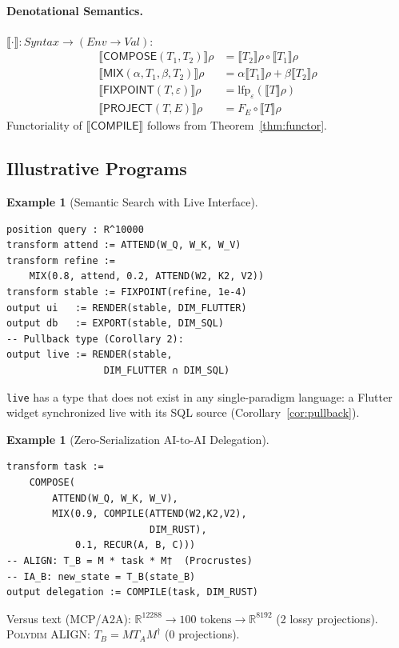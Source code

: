 \documentclass[10pt,twocolumn]{article}
\theoremstyle{plain}
\theoremstyle{definition}
\newtheorem{example}[theorem]{Example}
\theoremstyle{remark}
\newcommand{\RR}{\mathbb{R}}
\newcommand{\Compose}{\mathsf{COMPOSE}}
\newcommand{\Mix}{\mathsf{MIX}}
\newcommand{\Fixpoint}{\mathsf{FIXPOINT}}
\newcommand{\Project}{\mathsf{PROJECT}}
\newcommand{\lfp}{\mathrm{lfp}}
\begin{document}
\paragraph{Denotational Semantics.}
$\llbracket\cdot\rrbracket:\mathit{Syntax}\to(\mathit{Env}\to\mathit{Val})$:
\begin{align*}
\llbracket\Compose(T_1,T_2)\rrbracket\rho
  &=\llbracket T_2\rrbracket\rho\circ\llbracket T_1\rrbracket\rho\\
\llbracket\Mix(\alpha,T_1,\beta,T_2)\rrbracket\rho
  &=\alpha\llbracket T_1\rrbracket\rho+\beta\llbracket T_2\rrbracket\rho\\
\llbracket\Fixpoint(T,\varepsilon)\rrbracket\rho
  &=\lfp_\varepsilon(\llbracket T\rrbracket\rho)\\
\llbracket\Project(T,E)\rrbracket\rho
  &=F_E\circ\llbracket T\rrbracket\rho
\end{align*}
Functoriality of $\llbracket\mathsf{COMPILE}\rrbracket$ follows from
Theorem~\ref{thm:functor}.

\subsection{Illustrative Programs}

\begin{example}[Semantic Search with Live Interface]
\begin{lstlisting}[language=polydim]
position query : R^10000
transform attend := ATTEND(W_Q, W_K, W_V)
transform refine :=
    MIX(0.8, attend, 0.2, ATTEND(W2, K2, V2))
transform stable := FIXPOINT(refine, 1e-4)
output ui   := RENDER(stable, DIM_FLUTTER)
output db   := EXPORT(stable, DIM_SQL)
-- Pullback type (Corollary 2):
output live := RENDER(stable,
                 DIM_FLUTTER ∩ DIM_SQL)
\end{lstlisting}
\texttt{live} has a type that does not exist in any single-paradigm language:
a Flutter widget synchronized live with its SQL source (Corollary~\ref{cor:pullback}).
\end{example}

\begin{example}[Zero-Serialization AI-to-AI Delegation]
\begin{lstlisting}[language=polydim]
transform task :=
    COMPOSE(
        ATTEND(W_Q, W_K, W_V),
        MIX(0.9, COMPILE(ATTEND(W2,K2,V2),
                         DIM_RUST),
            0.1, RECUR(A, B, C)))
-- ALIGN: T_B = M * task * M†  (Procrustes)
-- IA_B: new_state = T_B(state_B)
output delegation := COMPILE(task, DIM_RUST)
\end{lstlisting}
Versus text (MCP/A2A): $\RR^{12288}\to100\text{ tokens}\to\RR^{8192}$
(2 lossy projections). \textsc{Polydim} ALIGN: $T_B=MT_AM^\dagger$ (0 projections).
\end{example}
\end{document}
